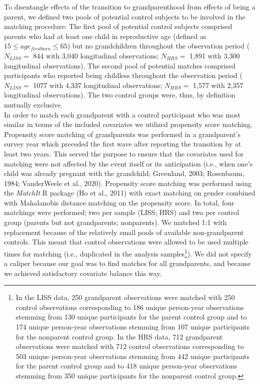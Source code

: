 \documentclass[
  english,
  man, noextraspace]{apa7}
\begin{document}
To disentangle effects of the transition to grandparenthood from effects of being a parent, we defined two pools of potential control subjects to be involved in the matching procedure: The first pool of potential control subjects comprised parents who had at least one child in reproductive age (defined as \(15 \leq age_{firstborn}\leq65\)) but no grandchildren throughout the observation period (\(N_{LISS} =\) 844 with 3,040 longitudinal observations; \(N_{HRS} =\) 1,891 with 3,300 longitudinal observations). The second pool of potential matches comprised participants who reported being childless throughout the observation period (\(N_{LISS} =\) 1077 with 4,337 longitudinal observations; \(N_{HRS} =\) 1,577 with 2,357 longitudinal observations). The two control groups were, thus, by definition mutually exclusive.\\
In order to match each grandparent with a control participant who was most similar in terms of the included covariates we utilized propensity score matching. Propensity score matching of grandparents was performed in a grandparent's survey year which preceded the first wave after reporting the transition by at least two years. This served the purpose to ensure that the covariates used for matching were not affected by the event itself or its anticipation (i.e., when one's child was already pregnant with the grandchild; Greenland, 2003; Rosenbaum, 1984; VanderWeele et al., 2020). Propensity score matching was performed using the \emph{MatchIt} R package (Ho et al., 2011) with exact matching on gender combined with Mahalanobis distance matching on the propensity score. In total, four matchings were performed; two per sample (LISS; HRS) and two per control group (parents but not grandparents; nonparents). We matched 1:1 with replacement because of the relatively small pools of available non-grandparent controls. This meant that control observations were allowed to be used multiple times for matching (i.e., duplicated in the analysis samples\footnote{In the LISS data, 250 grandparent observations were matched with 250 control observations corresponding to 186 unique person-year observations stemming from 130 unique participants for the parent control group and to 174 unique person-year observations stemming from 107 unique participants for the nonparent control group. In the HRS data, 712 grandparent observations were matched with 712 control observations corresponding to 503 unique person-year observations stemming from 442 unique participants for the parent control group and to 418 unique person-year observations stemming from 350 unique participants for the nonparent control group.}). We did not specify a caliper because our goal was to find matches for all grandparents, and because we achieved satisfactory covariate balance this way.\\
\end{document}
